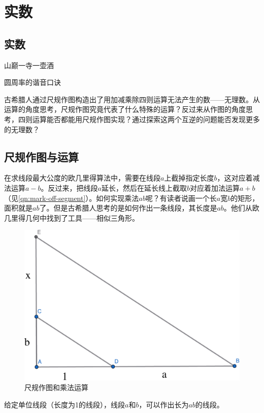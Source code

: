 \documentclass[b5paper]{ctexart}
\begin{document}
\ifx\wholebook\relax
\chapter{实数}
\else
\section{实数}
\fi

\epigraph{山巅一寺一壶酒}{圆周率的谐音口诀}

古希腊人通过尺规作图构造出了用加减乘除四则运算无法产生的数——无理数。从运算的角度思考，尺规作图究竟代表了什么特殊的运算？反过来从作图的角度思考，四则运算能否都能用尺规作图实现？通过探索这两个互逆的问题能否发现更多的无理数？

\section{尺规作图与运算}
\label{sec:geometric-arthimetic}
在求线段最大公度的欧几里得算法中，需要在线段$a$上截掉指定长度$b$，这对应着减法运算$a - b$。反过来，把线段$a$延长，然后在延长线上截取$b$对应着加法运算$a + b$（见\cref{qn:mark-off-segment}）。如何实现乘法$ab$呢？有读者说画一个长$a$宽$b$的矩形，面积就是$ab$了。但是古希腊人思考的是如何作出一条线段，其长度是$ab$。他们从欧几里得几何中找到了工具——相似三角形。

\begin{figure}[htbp]
 \centering
 \includegraphics[scale=0.35]{img/product}
 \caption{尺规作图和乘法运算}
 \label{fig:product}
\end{figure}

\begin{proposition}
给定单位线段（长度为1的线段），线段$a$和$b$，可以作出长为$ab$的线段。
\end{proposition}
\end{document}
